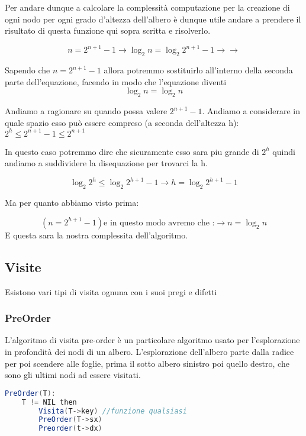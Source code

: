 Per andare dunque a calcolare la complessità computazione per la creazione di ogni nodo per ogni grado d'altezza dell'albero è dunque utile andare a prendere il risultato di questa funzione qui sopra scritta e risolverlo.

$$n=2^{n+1}-1 \rightarrow \log_{2}n = \log_{2}2^{n+1}-1 \rightarrow \rightarrow$$

Sapendo che $n = 2^{n+1}-1$ allora potremmo sostituirlo all'interno della seconda parte dell'equazione, facendo in modo che l'equazione diventi
$$\log_{2}n = \log_{2}n $$

Andiamo a ragionare su quando possa valere $2^{n+1}-1$. Andiamo a considerare in quale spazio esso può essere compreso (a seconda dell'altezza h):
$2^h\le 2^{n+1}-1\le 2^{n+1}$

In questo caso potremmo dire che sicuramente esso sara piu grande di $2^h$ quindi andiamo a suddividere la disequazione per trovarci la h.

$$\log_{2}2^h \le \log_{2}2^{h+1}-1 \rightarrow h = \log_{2}2^{h+1}-1 $$

Ma per quanto abbiamo visto prima:

$$(n=2^{h+1}-1) \text{e in questo modo avremo che :} \rightarrow n = \log_{2}n$$
E questa sara la nostra complessita dell'algoritmo.


 
\subsection{Visite}
Esistono vari tipi di visita ognuna con i suoi pregi e difetti
\subsubsection{PreOrder}
L'algoritmo di visita pre-order è un particolare algoritmo usato per l'esplorazione in profondità dei nodi di un albero. L'esplorazione dell'albero parte dalla radice per poi scendere alle foglie, prima il sotto albero sinistro poi quello destro, che sono gli ultimi nodi ad essere visitati.
\begin{lstlisting}[language=Java]
PreOrder(T):
	T != NIL then
		Visita(T->key) //funzione qualsiasi
		PreOrder(T->sx)
		Preorder(t->dx)	
\end{lstlisting}
